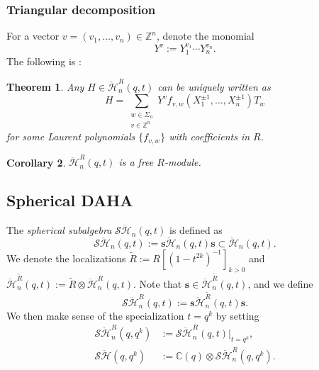 \documentclass[11pt]{article}
\newtheorem{thm}{Theorem}[section]
\newtheorem{cor}[thm]{Corollary}
\theoremstyle{definition}
\newcommand{\ZZ}{\mathbb{Z}}
\newcommand{\CC}{\mathbb{C}}
\newcommand{\SHH}{\mathcal{S}\ddot{\mathcal{H}}}
\newcommand{\HH}{\ddot{\mathcal{H}}}
\newcommand{\ee}{\boldsymbol{s}}
\begin{document}
\subsubsection{Triangular decomposition}
For a vector $v=(v_1,\ldots, v_n)\in\ZZ^n$, denote the monomial
\[
Y^{v}:=Y_1^{v_1}\cdots Y_n^{v_n}.
\]
The following is \cite[Th.\,2.3(ii)]{ChereAnnals}:
\begin{thm}
Any $H\in\HH_n^R(q,t)$ can be uniquely written as
\begin{equation}
H=\sum_{\substack{w\in\Sigma_n\\ v\in\ZZ^n}}Y^vf_{v,w}(X^{\pm 1}_1,\ldots,X^{\pm 1}_n)T_w
\label{DAHAPBW}
\end{equation}
for some Laurent polynomials $\{f_{v,w}\}$ with coefficients in $R$.
\end{thm}

\begin{cor}\label{DAHAFree}
$\HH_n^R(q,t)$ is a free $R$-module.
\end{cor}

\subsection{Spherical DAHA}
The \textit{spherical subalgebra} $\SHH_n(q,t)$ is defined as
\[
\SHH_n(q,t):=\ee\HH_n(q,t)\ee\subset\HH_n(q,t).
\]
We denote the localizations $\tilde{R}:=R[(1-t^{2k})^{-1}]_{k>0}$ and $\HH^{\tilde{R}}_n(q,t):=\tilde{R}\otimes \HH^R_n(q,t)$.
Note that $\ee\in \HH^{\tilde{R}}_n(q,t)$, and we define
\[
\SHH_n^R(q,t):=\ee\HH_n^{\tilde{R}}(q,t)\ee.
\]
We then make sense of the specialization $t=q^k$ by setting
\begin{align*}
\SHH_n^R(q,q^k)&:=\SHH_n^R(q,t)\big|_{t=q^k},\\
\SHH(q,q^k)&:=\CC(q)\otimes\SHH_n^R(q,q^k).
\end{align*}
\end{document}
